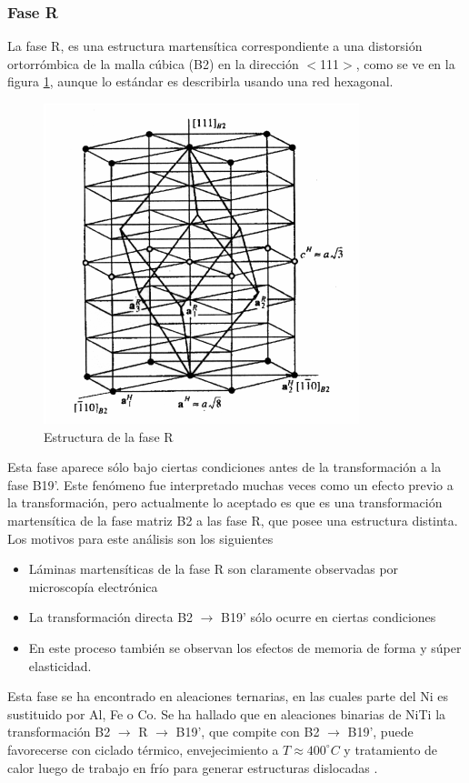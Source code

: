 \documentclass[12pt]{article}
\theoremstyle{definition}
\theoremstyle{remark}
\begin{document}
\subsubsection{Fase R}
La fase R, es una estructura martensítica correspondiente a una distorsión
ortorrómbica de la malla cúbica (B2) en la dirección $<$111$>$, como se ve en la figura \ref{RPhase}, aunque lo estándar es describirla usando una red hexagonal.
\begin{figure}[H]
	\centering	
	\includegraphics[scale=0.5]{img/RPhase.png}
	\caption{Estructura de la fase R}
	\label{RPhase}
\end{figure}

Esta fase aparece sólo bajo ciertas condiciones antes de la transformación a la fase B19'. Este fenómeno fue interpretado muchas veces como un efecto previo a la transformación, pero actualmente lo aceptado es que es una transformación martensítica de la fase matriz B2 a las fase R, que posee una estructura distinta. Los motivos para este análisis son los siguientes
\begin{itemize}
	\item Láminas martensíticas de la fase R son claramente observadas por microscopía electrónica
	\item La transformación directa B2 $\rightarrow$ B19' sólo ocurre en ciertas condiciones
	\item En este proceso también se observan los efectos de memoria de forma y súper elasticidad.
\end{itemize}


Esta fase se ha encontrado en aleaciones ternarias, en las cuales parte del Ni es sustituido por Al, Fe o Co. Se ha hallado que en  aleaciones binarias de NiTi la transformación B2 $\rightarrow$ R $\rightarrow$ B19', que compite con B2 $\rightarrow$ B19', puede favorecerse con ciclado térmico, envejecimiento a $T \approx 400 ^\circ C$ y tratamiento de calor luego de trabajo en frío para generar estructuras dislocadas \citep{Santamarta}\citep{ThinFilm}\cite{TiNi}. 
\end{document}
